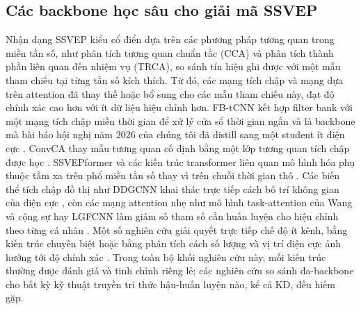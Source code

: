 \documentclass[11pt,a4paper,twoside,asymmetric]{article}
\begin{document}
\subsection{Các backbone học sâu cho giải mã SSVEP}
Nhận dạng SSVEP kiểu cổ điển dựa trên các phương pháp tương quan trong miền tần số, như phân tích tương quan chuẩn tắc (CCA) và phân tích thành phần liên quan đến nhiệm vụ (TRCA), so sánh tín hiệu ghi được với một mẫu tham chiếu tại từng tần số kích thích. Từ đó, các mạng tích chập và mạng dựa trên attention đã thay thế hoặc bổ sung cho các mẫu tham chiếu này, đạt độ chính xác cao hơn với ít dữ liệu hiệu chỉnh hơn. FB-tCNN kết hợp filter bank với một mạng tích chập miền thời gian để xử lý cửa sổ thời gian ngắn \cite{R16} và là backbone mà bài báo hội nghị năm 2026 của chúng tôi đã distill sang một student ít điện cực \cite{R82}. ConvCA thay mẫu tương quan cố định bằng một lớp tương quan tích chập được học \cite{R17}. SSVEPformer và các kiến trúc transformer liên quan mô hình hóa phụ thuộc tầm xa trên phổ miền tần số thay vì trên chuỗi thời gian thô \cite{R15,R23}. Các biến thể tích chập đồ thị như DDGCNN khai thác trực tiếp cách bố trí không gian của điện cực \cite{R18}, còn các mạng attention nhẹ như mô hình task-attention của Wang và cộng sự hay LGFCNN làm giảm số tham số cần huấn luyện cho hiệu chỉnh theo từng cá nhân \cite{R20,R26}. Một số nghiên cứu giải quyết trực tiếp chế độ ít kênh, bằng kiến trúc chuyên biệt \cite{R22,R25,R38} hoặc bằng phân tích cách số lượng và vị trí điện cực ảnh hưởng tới độ chính xác \cite{R36,R37}. Trong toàn bộ khối nghiên cứu này, mỗi kiến trúc thường được đánh giá và tinh chỉnh riêng lẻ; các nghiên cứu so sánh đa-backbone cho bất kỳ kỹ thuật truyền tri thức hậu-huấn luyện nào, kể cả KD, đều hiếm gặp.
\end{document}
